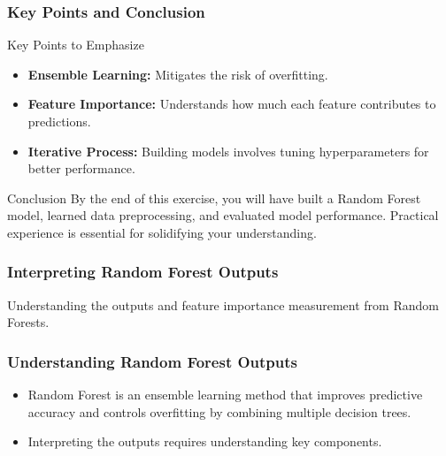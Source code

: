 \documentclass[aspectratio=169]{beamer}
\begin{document}
\begin{frame}
    \frametitle{Key Points and Conclusion}
    \begin{block}{Key Points to Emphasize}
        \begin{itemize}
            \item \textbf{Ensemble Learning:} Mitigates the risk of overfitting.
            \item \textbf{Feature Importance:} Understands how much each feature contributes to predictions.
            \item \textbf{Iterative Process:} Building models involves tuning hyperparameters for better performance.
        \end{itemize}
    \end{block}

    \begin{block}{Conclusion}
        By the end of this exercise, you will have built a Random Forest model, learned data preprocessing, and evaluated model performance. Practical experience is essential for solidifying your understanding.
    \end{block}
\end{frame}

\begin{frame}
    \frametitle{Interpreting Random Forest Outputs}
    Understanding the outputs and feature importance measurement from Random Forests.
\end{frame}

\begin{frame}
    \frametitle{Understanding Random Forest Outputs}
    \begin{itemize}
        \item Random Forest is an ensemble learning method that improves predictive accuracy and controls overfitting by combining multiple decision trees.
        \item Interpreting the outputs requires understanding key components.
    \end{itemize}
\end{frame}
\end{document}
